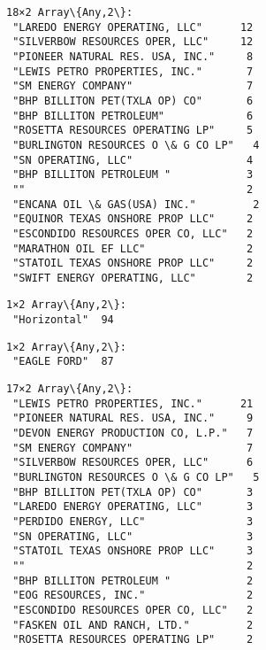 \documentclass[11pt]{article}
\begin{document}
    
    
    \begin{Verbatim}[commandchars=\\\{\}]
18×2 Array\{Any,2\}:
 "LAREDO ENERGY OPERATING, LLC"      12
 "SILVERBOW RESOURCES OPER, LLC"     12
 "PIONEER NATURAL RES. USA, INC."     8
 "LEWIS PETRO PROPERTIES, INC."       7
 "SM ENERGY COMPANY"                  7
 "BHP BILLITON PET(TXLA OP) CO"       6
 "BHP BILLITON PETROLEUM"             6
 "ROSETTA RESOURCES OPERATING LP"     5
 "BURLINGTON RESOURCES O \& G CO LP"   4
 "SN OPERATING, LLC"                  4
 "BHP BILLITON PETROLEUM "            3
 ""                                   2
 "ENCANA OIL \& GAS(USA) INC."         2
 "EQUINOR TEXAS ONSHORE PROP LLC"     2
 "ESCONDIDO RESOURCES OPER CO, LLC"   2
 "MARATHON OIL EF LLC"                2
 "STATOIL TEXAS ONSHORE PROP LLC"     2
 "SWIFT ENERGY OPERATING, LLC"        2
    \end{Verbatim}

    
    
    \begin{Verbatim}[commandchars=\\\{\}]
1×2 Array\{Any,2\}:
 "Horizontal"  94
    \end{Verbatim}

    
    
    \begin{Verbatim}[commandchars=\\\{\}]
1×2 Array\{Any,2\}:
 "EAGLE FORD"  87
    \end{Verbatim}

    
    
    \begin{Verbatim}[commandchars=\\\{\}]
17×2 Array\{Any,2\}:
 "LEWIS PETRO PROPERTIES, INC."      21
 "PIONEER NATURAL RES. USA, INC."     9
 "DEVON ENERGY PRODUCTION CO, L.P."   7
 "SM ENERGY COMPANY"                  7
 "SILVERBOW RESOURCES OPER, LLC"      6
 "BURLINGTON RESOURCES O \& G CO LP"   5
 "BHP BILLITON PET(TXLA OP) CO"       3
 "LAREDO ENERGY OPERATING, LLC"       3
 "PERDIDO ENERGY, LLC"                3
 "SN OPERATING, LLC"                  3
 "STATOIL TEXAS ONSHORE PROP LLC"     3
 ""                                   2
 "BHP BILLITON PETROLEUM "            2
 "EOG RESOURCES, INC."                2
 "ESCONDIDO RESOURCES OPER CO, LLC"   2
 "FASKEN OIL AND RANCH, LTD."         2
 "ROSETTA RESOURCES OPERATING LP"     2
    \end{Verbatim}
\end{document}
